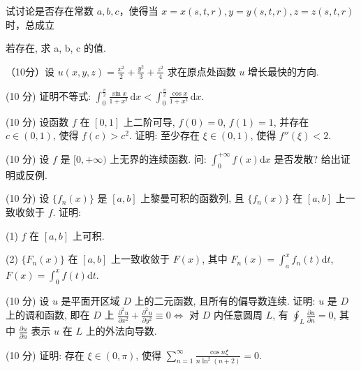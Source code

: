 \par{}
试讨论是否存在常数 $a, b, c$，使得当 $x = x(s, t, r), y = y(s, t, r), z = z(s, t, r)$ 时，总成立\par
\nopagebreak[4]
若存在, 求 a, b, c 的值.\par
\par{}
（10分）设 $u(x,y,z) = \frac{x^2}{2} +\frac{y^2}{3} +\frac{z^2}{4}$ 求在原点处函数 $u$ 增长最快的方向.\par
\par{}
(10 分) 证明不等式: $\int_{0}^{\frac{\pi}{2}} \frac{\sin x}{1 + x^{2}} \, \mathrm{d}x < \int_{0}^{\frac{\pi}{2}} \frac{\cos x}{1 + x^{2}} \, \mathrm{d}x$.\par
\par{}
(10 分) 设函数 $f$ 在 $[0,1]$ 上二阶可导, $f(0) = 0$, $f(1) = 1$, 并存在 $c \in (0,1)$, 使得 $f(c) > c^2$. 证明: 至少存在 $\xi \in (0,1)$, 使得 $f''(\xi) < 2$.\par
\par{}
(10 分) 设 $f$ 是 $[0, +\infty)$ 上无界的连续函数. 问: $\int_0^{+\infty} f(x) \mathrm{d}x$ 是否发散? 给出证明或反例.\par
\par{}
(10 分) 设 $\{f_n(x)\}$ 是 $[a, b]$ 上黎曼可积的函数列, 且 $\{f_n(x)\}$ 在 $[a, b]$ 上一致收敛于 $f$. 证明:\par
(1) $f$ 在 $[a, b]$ 上可积.\par
(2) $\{F_n(x)\}$ 在 $[a, b]$ 上一致收敛于 $F(x)$, 其中 $F_n(x) = \int_{a}^{x} f_n(t) \mathrm{d}t$, $F(x) = \int_{0}^{x} f(t) \mathrm{d}t$.\par
\par{}
(10 分) 设 $u$ 是平面开区域 $D$ 上的二元函数, 且所有的偏导数连续. 证明: $u$ 是 $D$ 上的调和函数, 即在 $D$ 上 $\frac{\partial^2 u}{\partial x^2} + \frac{\partial^2 u}{\partial y^2} \equiv 0 \Longleftrightarrow$ 对 $D$ 内任意圆周 $L$, 有 $\oint_L \frac{\partial u}{\partial n} = 0$, 其中 $\frac{\partial u}{\partial n}$ 表示 $u$ 在 $L$ 上的外法向导数.\par
\par{}
(10 分) 证明: 存在 $\xi \in (0, \pi)$, 使得 $\sum_{n=1}^{\infty} \frac{\cos n\xi}{n \ln^{2}(n+2)} = 0$.\par
